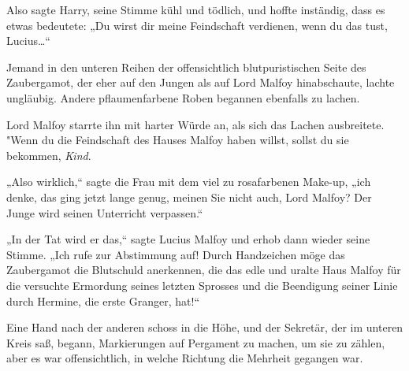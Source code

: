 Also sagte Harry, seine Stimme kühl und tödlich, und hoffte inständig, dass es etwas bedeutete: „Du wirst dir meine Feindschaft verdienen, wenn du das tust, Lucius…“

Jemand in den unteren Reihen der offensichtlich blutpuristischen Seite des Zaubergamot, der eher auf den Jungen als auf Lord Malfoy hinabschaute, lachte ungläubig. Andere pflaumenfarbene Roben begannen ebenfalls zu lachen.

Lord Malfoy starrte ihn mit harter Würde an, als sich das Lachen ausbreitete.
"Wenn du die Feindschaft des Hauses Malfoy haben willst, sollst du sie bekommen, \emph{Kind}.

„Also wirklich,“ sagte die Frau mit dem viel zu rosafarbenen Make-up, „ich denke, das ging jetzt lange genug, meinen Sie nicht auch, Lord Malfoy? Der Junge wird seinen Unterricht verpassen.“

„In der Tat wird er das,“ sagte Lucius Malfoy und erhob dann wieder seine Stimme. „Ich rufe zur Abstimmung auf! Durch Handzeichen möge das Zaubergamot die Blutschuld anerkennen, die das edle und uralte Haus Malfoy für die versuchte Ermordung seines letzten Sprosses und die Beendigung seiner Linie durch Hermine, die erste Granger, hat!“

Eine Hand nach der anderen schoss in die Höhe, und der Sekretär, der im unteren Kreis saß, begann, Markierungen auf Pergament zu machen, um sie zu zählen, aber es war offensichtlich, in welche Richtung die Mehrheit gegangen war.


